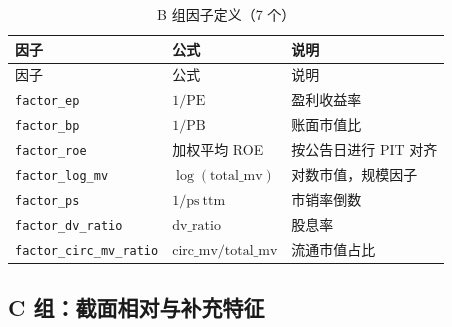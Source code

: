 \documentclass[12pt, a4paper, oneside]{article}
\begin{document}
\begin{longtable}{L{0.37\textwidth} L{0.30\textwidth} L{0.27\textwidth}}
\caption{B 组因子定义（7 个）}\label{tab:appendix-b}\\
\toprule
因子 & 公式 & 说明 \\
\midrule
\endfirsthead
\toprule
因子 & 公式 & 说明 \\
\midrule
\endhead
\bottomrule
\endfoot
\texttt{factor\_ep} & $1/\mathrm{PE}$ & 盈利收益率 \\
\texttt{factor\_bp} & $1/\mathrm{PB}$ & 账面市值比 \\
\texttt{factor\_roe} & 加权平均 ROE & 按公告日进行 PIT 对齐 \\
\texttt{factor\_log\_mv} & $\log(\mathrm{total\_mv})$ & 对数市值，规模因子 \\
\texttt{factor\_ps} & $1/\mathrm{ps\ ttm}$ & 市销率倒数 \\
\texttt{factor\_dv\_ratio} & \(\mathrm{dv\_ratio}\) & 股息率 \\
\texttt{factor\_circ\_mv\_ratio} & \(\mathrm{circ\_mv}/\mathrm{total\_mv}\) & 流通市值占比 \\
\end{longtable}

\subsection{C 组：截面相对与补充特征}
\end{document}
